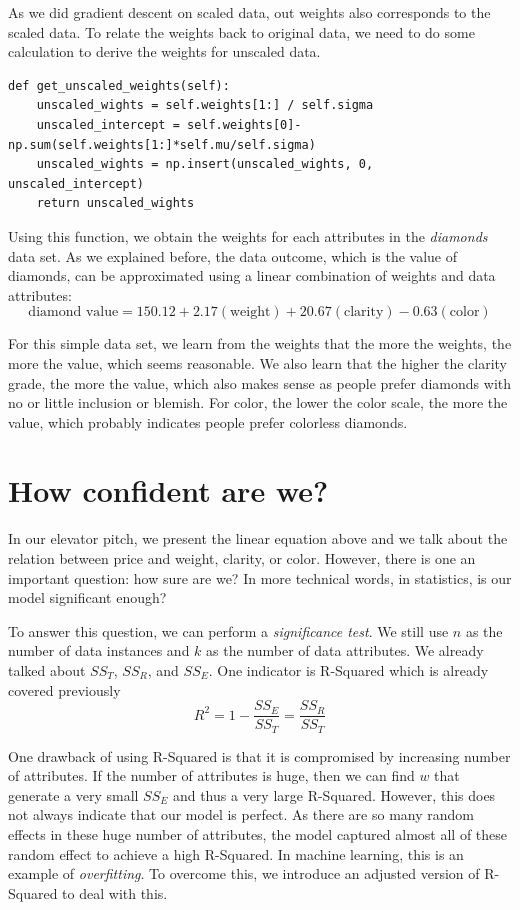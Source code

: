 \documentclass[
	letterpaper
]{article}
\begin{document}
As we did gradient descent on scaled data, out weights also corresponds to the scaled data.
To relate the weights back to original data, we need to do some calculation to derive the weights for unscaled data.
\begin{lstlisting}
def get_unscaled_weights(self):
    unscaled_wights = self.weights[1:] / self.sigma
    unscaled_intercept = self.weights[0]-np.sum(self.weights[1:]*self.mu/self.sigma)
    unscaled_wights = np.insert(unscaled_wights, 0, unscaled_intercept)
    return unscaled_wights
\end{lstlisting}

Using this function, we obtain the weights for each attributes in the \textit{diamonds} data set.
As we explained before, the data outcome, which is the value of diamonds, can be approximated using a linear combination of weights and data attributes:
\begin{equation}
\text{diamond value} = 150.12+ 2.17 (\text{weight}) + 20.67(\text{clarity})-0.63(\text{color})
\end{equation}

For this simple data set, we learn from the weights that the more the weights, the more the value, which seems reasonable.
We also learn that the higher the clarity grade, the more the value, which also makes sense as people prefer diamonds with no or little inclusion or blemish.
For color, the lower the color scale, the more the value, which probably indicates people prefer colorless diamonds.

\section{How confident are we?}
In our elevator pitch, we present the linear equation above and we talk about the relation between price and weight, clarity, or color.
However, there is one an important question: how sure are we?
In more technical words, in statistics, is our model significant enough?

To answer this question, we can perform a \textit{significance test}.
We still use $n$ as the number of data instances and $k$ as the number of data attributes.
We already talked about $SS_T$, $SS_R$, and $SS_E$.
One indicator is R-Squared which is already covered previously
\begin{equation}
R^2 = 1 - \frac{SS_E}{SS_T} = \frac{SS_R}{SS_T}
\end{equation}

One drawback of using R-Squared is that it is compromised by increasing number of attributes.
If the number of attributes is huge, then we can find $w$ that generate a very small $SS_E$ and thus a very large R-Squared.
However, this does not always indicate that our model is perfect.
As there are so many random effects in these huge number of attributes, the model captured almost all of these random effect to achieve a high R-Squared.
In machine learning, this is an example of \textit{overfitting}.
To overcome this, we introduce an adjusted version of R-Squared to deal with this.
\end{document}
